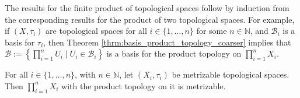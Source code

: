 \begin{remark}
	The results for the finite product of topological spaces follow by induction from the corresponding results for the product of two topological spaces. For example, if $(X, \tau_i)$ are topological spaces for all $i\in \{1, \dots, n\}$ for some $n\in\mathbb N$, and $\mathscr B_i$ is a basis for $\tau_i$, then Theorem \ref{thrm:basis_product_topology_coarser} implies that $\mathscr B := \left\{\prod_{i=1}^{n}U_i\mid U_i\in \mathscr B_i\right\}$ is a basis for the product topology on $\prod_{i=1}^{n}X_i$.
\end{remark}

\begin{theorem}\label{thrm:product_of_metrizable_topologies_is_metrizable}
	For all $i\in\{1, \dots, n\}$, with $n\in\mathbb N$, let $(X_i, \tau_i)$ be metrizable topological spaces. Then $\prod_{i=1}^{n}X_i$ with the product topology on it is metrizable.
\end{theorem}

